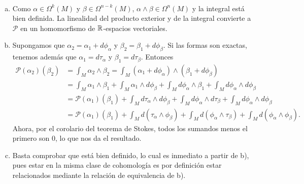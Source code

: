 \documentclass[twoside]{article}
\begin{document}
\begin{solucion}\
\begin{enumerate}[a)]
\item Como $\alpha\in\Omega^k(M)$ y $\beta\in\Omega^{n-k}(M)$, $\alpha\land\beta\in\Omega^n(M)$ y la integral está bien definida. La linealidad del producto exterior y de la integral convierte a $\mathcal{P}$ en un homomorfismo de $\mathbb{R}$-espacios vectoriales.
\item Supongamos que $\alpha_2=\alpha_1+d\phi_{\alpha}$ y $\beta_2=\beta_1+d\phi_{\beta}$. Si las formas son exactas, tenemos además que $\alpha_1=d\tau_{\alpha}$ y $\beta_1=d\tau_{\beta}$. Entonces
\begin{align*}
\mathcal{P}(\alpha_2)(\beta_2)&=\int_M\alpha_2\land\beta_2=\int_M(\alpha_1+d\phi_{\alpha})\land (\beta_1+d\phi_{\beta})\\
&=\int_M\alpha_1\land\beta_1+\int_M\alpha_1\land d\phi_{\beta}+\int_Md\phi_{\alpha}\land\beta_1+\int_Md\phi_{\alpha}\land d\phi_{\beta}\\
&=\mathcal{P}(\alpha_1)(\beta_1)+\int_Md\tau_{\alpha}\land d\phi_{\beta}+\int_Md\phi_{\alpha}\land d\tau_{\beta}+\int_Md\phi_{\alpha}\land d\phi_{\beta}\\
&=\mathcal{P}(\alpha_1)(\beta_1)+\int_Md(\tau_{\alpha}\land \phi_{\beta})+\int_Md(\phi_{\alpha}\land \tau_{\beta})+\int_Md(\phi_{\alpha}\land \phi_{\beta}).
\end{align*}
Ahora, por el corolario del teorema de Stokes, todos los sumandos menos el primero son 0, lo que nos da el resultado. 
\item Basta comprobar que está bien definido, lo cual es inmediato a partir de b), pues estar en la misma clase de cohomología es por definición estar relacionados mediante la relación de equivalencia de b).
\end{enumerate}
\end{solucion}
\end{document}
